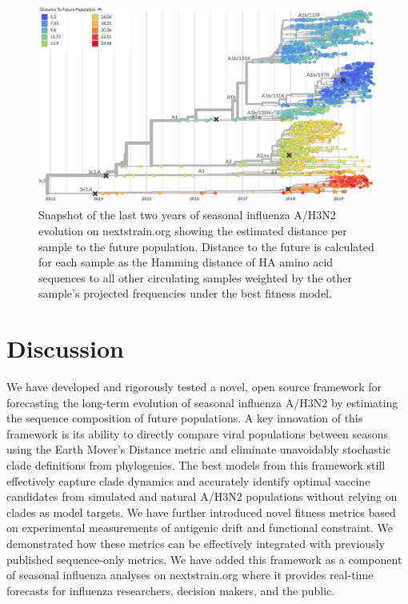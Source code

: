 \begin{figure}[ht]
  \begin{center}
  \includegraphics[width=\textwidth]{figures/nextstrain-weighted-distance-to-future-per-strain.png}
  \caption{
    Snapshot of the last two years of seasonal influenza A/H3N2 evolution on nextstrain.org showing the estimated distance per sample to the future population.
    Distance to the future is calculated for each sample as the Hamming distance of HA amino acid sequences to all other circulating samples weighted by the other sample's projected frequencies under the best fitness model.
  }
  \label{fig:nextstrain_distance_to_future}
  \end{center}
\end{figure}

\pagebreak

\section*{Discussion}

We have developed and rigorously tested a novel, open source framework for forecasting the long-term evolution of seasonal influenza A/H3N2 by estimating the sequence composition of future populations.
A key innovation of this framework is its ability to directly compare viral populations between seasons using the Earth Mover's Distance metric \cite{Rubner1998} and eliminate unavoidably stochastic clade definitions from phylogenies.
The best models from this framework still effectively capture clade dynamics and accurately identify optimal vaccine candidates from simulated and natural A/H3N2 populations without relying on clades as model targets.
We have further introduced novel fitness metrics based on experimental measurements of antigenic drift and functional constraint.
We demonstrated how these metrics can be effectively integrated with previously published sequence-only metrics.
We have added this framework as a component of seasonal influenza analyses on nextstrain.org where it provides real-time forecasts for influenza researchers, decision makers, and the public.

